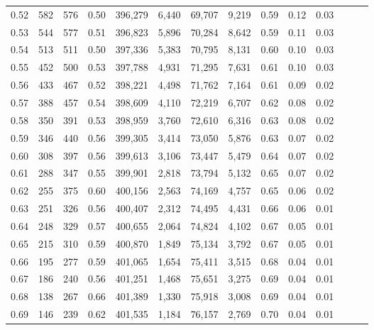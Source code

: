 \begin{tabular}{rrrrrrrrrrrrrr}
0.52 &     582 &    576 &  0.50 &  396,279 &    6,440 &  69,707 &   9,219 &  0.59 &  0.12 &      0.03 \\
0.53 &     544 &    577 &  0.51 &  396,823 &    5,896 &  70,284 &   8,642 &  0.59 &  0.11 &      0.03 \\
0.54 &     513 &    511 &  0.50 &  397,336 &    5,383 &  70,795 &   8,131 &  0.60 &  0.10 &      0.03 \\
0.55 &     452 &    500 &  0.53 &  397,788 &    4,931 &  71,295 &   7,631 &  0.61 &  0.10 &      0.03 \\
0.56 &     433 &    467 &  0.52 &  398,221 &    4,498 &  71,762 &   7,164 &  0.61 &  0.09 &      0.02 \\
0.57 &     388 &    457 &  0.54 &  398,609 &    4,110 &  72,219 &   6,707 &  0.62 &  0.08 &      0.02 \\
0.58 &     350 &    391 &  0.53 &  398,959 &    3,760 &  72,610 &   6,316 &  0.63 &  0.08 &      0.02 \\
0.59 &     346 &    440 &  0.56 &  399,305 &    3,414 &  73,050 &   5,876 &  0.63 &  0.07 &      0.02 \\
0.60 &     308 &    397 &  0.56 &  399,613 &    3,106 &  73,447 &   5,479 &  0.64 &  0.07 &      0.02 \\
0.61 &     288 &    347 &  0.55 &  399,901 &    2,818 &  73,794 &   5,132 &  0.65 &  0.07 &      0.02 \\
0.62 &     255 &    375 &  0.60 &  400,156 &    2,563 &  74,169 &   4,757 &  0.65 &  0.06 &      0.02 \\
0.63 &     251 &    326 &  0.56 &  400,407 &    2,312 &  74,495 &   4,431 &  0.66 &  0.06 &      0.01 \\
0.64 &     248 &    329 &  0.57 &  400,655 &    2,064 &  74,824 &   4,102 &  0.67 &  0.05 &      0.01 \\
0.65 &     215 &    310 &  0.59 &  400,870 &    1,849 &  75,134 &   3,792 &  0.67 &  0.05 &      0.01 \\
0.66 &     195 &    277 &  0.59 &  401,065 &    1,654 &  75,411 &   3,515 &  0.68 &  0.04 &      0.01 \\
0.67 &     186 &    240 &  0.56 &  401,251 &    1,468 &  75,651 &   3,275 &  0.69 &  0.04 &      0.01 \\
0.68 &     138 &    267 &  0.66 &  401,389 &    1,330 &  75,918 &   3,008 &  0.69 &  0.04 &      0.01 \\
0.69 &     146 &    239 &  0.62 &  401,535 &    1,184 &  76,157 &   2,769 &  0.70 &  0.04 &      0.01 \\

\end{tabular}

